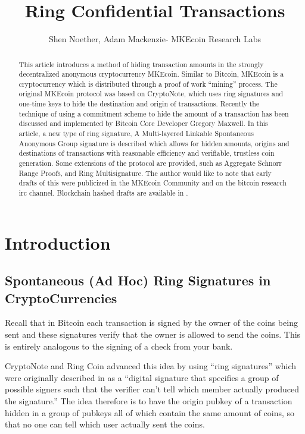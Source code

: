 \documentclass[12pt,oneside,english]{amsart}
\numberwithin{equation}{section}
\numberwithin{figure}{section}
\theoremstyle{plain}
\theoremstyle{plain}
\theoremstyle{remark}
\theoremstyle{plain}
\theoremstyle{remark}
\theoremstyle{remark}
\theoremstyle{plain}
\theoremstyle{definition}
\begin{document}
\title{Ring Confidential Transactions}


\author{Shen Noether, Adam Mackenzie- MKEcoin Research Labs}
\begin{abstract}
This article introduces a method of hiding transaction amounts in
the strongly decentralized anonymous cryptocurrency MKEcoin. Similar
to Bitcoin, MKEcoin is a cryptocurrency which is distributed through
a proof of work ``mining'' process. The original MKEcoin protocol
was based on CryptoNote, which uses ring signatures and one-time keys
to hide the destination and origin of transactions. Recently the technique
of using a commitment scheme to hide the amount of a transaction has
been discussed and implemented by Bitcoin Core Developer Gregory Maxwell.
In this article, a new type of ring signature, A Multi-layered Linkable
Spontaneous Anonymous Group signature is described which allows for hidden
amounts, origins and destinations of transactions with reasonable
efficiency and verifiable, trustless coin generation. Some extensions of the protocol are provided, such as Aggregate Schnorr Range Proofs, and Ring Multisignature. The author would like to note that early drafts of this were publicized in the MKEcoin Community and on the bitcoin research irc channel. Blockchain hashed drafts are available in \cite{Snoe}.
\end{abstract}

\maketitle

\tableofcontents
\section{Introduction}


\subsection{Spontaneous (Ad Hoc) Ring Signatures in CryptoCurrencies}

Recall that in Bitcoin each transaction is signed by the owner of
the coins being sent and these signatures verify that the owner is
allowed to send the coins. This is entirely analogous to the signing
of a check from your bank.

CryptoNote \cite{CN} and Ring Coin
\cite{B2} advanced this idea by using ``ring signatures'' which were originally described
in \cite{RST} as a ``digital signature that specifies a group of
possible signers such that the verifier can't tell which member actually
produced the signature.'' The idea therefore is to have the origin
pubkey of a transaction hidden in a group of pubkeys all of which contain
the same amount of coins, so that no one can tell which user actually
sent the coins. 
\end{document}
